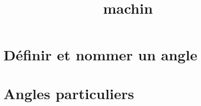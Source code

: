 \documentclass[12pt,a4paper]{article}
\date{}
\title{machin}
\begin{document}
%
%

%

%
%
%
%
%
%
%
%
\section{Définir et nommer un angle}



\section{Angles particuliers}


\end{document}
